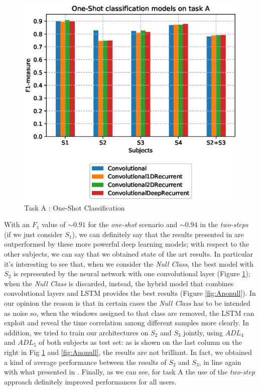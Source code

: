 \begin{figure}[ht]
	\centering
	\includegraphics[scale=.4]{figure/A_models_nullclass}
	\caption{Task A : One-Shot Classification}
	\label{fig:Anull}
\end{figure}

With an $F_1$ value of $\sim 0.91$ for the \textit{one-shot} scenario and $\sim 0.94$ in the \textit{two-steps} (if we just consider $S_1$), we can definitely say that the results presented in \cite{Chavarriaga2013} are outperformed by these more powerful deep learning models; with respect to the other subjects, we can say that we obtained state of the art results. In particular it's interesting to see that, when we consider the \textit{Null Class}, the best model with $S_2$ is represented by the neural network with one convolutional layer (Figure \ref{fig:Anull}); when the \textit{Null Class} is discarded, instead, the hybrid model that combines convolutional layers and LSTM provides the best results (Figure \ref{fig:Anonull}). In our opinion the reason is that in certain cases the \textit{Null Class} has to be intended as noise so, when the windows assigned to that class are removed, the LSTM can exploit and reveal the time correlation among different samples more clearly. In addition, we tried to train our architectures on $S_2$ and $S_3$ jointly, using $ADL_4$ and $ADL_5$ of both subjects as test set: as is shown on the last column on the right in Fig \ref{fig:Anull} and \ref{fig:Anonull}, the results are not brilliant. In fact, we obtained a kind of average performance between the results of $S_2$ and $S_3$, in line again with what presented in \cite{Chavarriaga2013}. Finally, as we can see, for task A the use of the \textit{two-step} approach definitely improved performances for all users. 

